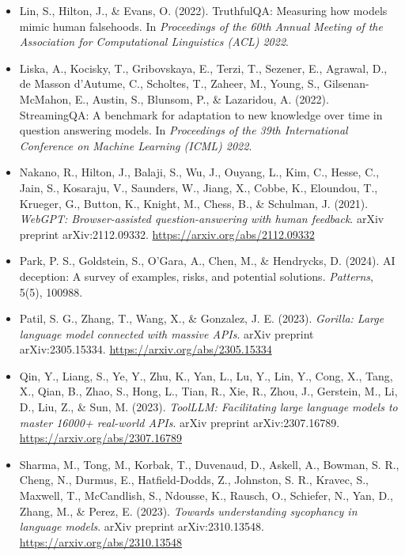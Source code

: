 \documentclass[11pt]{article}
\begin{document}
\begin{itemize}[leftmargin=*, label={}]
\item Lin, S., Hilton, J., \& Evans, O. (2022). TruthfulQA: Measuring how models mimic human falsehoods. In \emph{Proceedings of the 60th Annual Meeting of the Association for Computational Linguistics (ACL) 2022}.

\item Liska, A., Kocisky, T., Gribovskaya, E., Terzi, T., Sezener, E., Agrawal, D., de Masson d'Autume, C., Scholtes, T., Zaheer, M., Young, S., Gilsenan-McMahon, E., Austin, S., Blunsom, P., \& Lazaridou, A. (2022). StreamingQA: A benchmark for adaptation to new knowledge over time in question answering models. In \emph{Proceedings of the 39th International Conference on Machine Learning (ICML) 2022}.

\item Nakano, R., Hilton, J., Balaji, S., Wu, J., Ouyang, L., Kim, C., Hesse, C., Jain, S., Kosaraju, V., Saunders, W., Jiang, X., Cobbe, K., Eloundou, T., Krueger, G., Button, K., Knight, M., Chess, B., \& Schulman, J. (2021). \emph{WebGPT: Browser-assisted question-answering with human feedback}. arXiv preprint arXiv:2112.09332. \url{https://arxiv.org/abs/2112.09332}

\item Park, P. S., Goldstein, S., O'Gara, A., Chen, M., \& Hendrycks, D. (2024). AI deception: A survey of examples, risks, and potential solutions. \emph{Patterns}, 5(5), 100988.

\item Patil, S. G., Zhang, T., Wang, X., \& Gonzalez, J. E. (2023). \emph{Gorilla: Large language model connected with massive APIs}. arXiv preprint arXiv:2305.15334. \url{https://arxiv.org/abs/2305.15334}

\item Qin, Y., Liang, S., Ye, Y., Zhu, K., Yan, L., Lu, Y., Lin, Y., Cong, X., Tang, X., Qian, B., Zhao, S., Hong, L., Tian, R., Xie, R., Zhou, J., Gerstein, M., Li, D., Liu, Z., \& Sun, M. (2023). \emph{ToolLLM: Facilitating large language models to master 16000+ real-world APIs}. arXiv preprint arXiv:2307.16789. \url{https://arxiv.org/abs/2307.16789}

\item Sharma, M., Tong, M., Korbak, T., Duvenaud, D., Askell, A., Bowman, S. R., Cheng, N., Durmus, E., Hatfield-Dodds, Z., Johnston, S. R., Kravec, S., Maxwell, T., McCandlish, S., Ndousse, K., Rausch, O., Schiefer, N., Yan, D., Zhang, M., \& Perez, E. (2023). \emph{Towards understanding sycophancy in language models}. arXiv preprint arXiv:2310.13548. \url{https://arxiv.org/abs/2310.13548}


\end{itemize}
\end{document}
